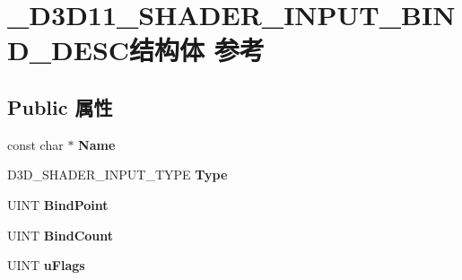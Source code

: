 \hypertarget{struct___d3_d11___s_h_a_d_e_r___i_n_p_u_t___b_i_n_d___d_e_s_c}{}\section{\+\_\+\+D3\+D11\+\_\+\+S\+H\+A\+D\+E\+R\+\_\+\+I\+N\+P\+U\+T\+\_\+\+B\+I\+N\+D\+\_\+\+D\+E\+S\+C结构体 参考}
\label{struct___d3_d11___s_h_a_d_e_r___i_n_p_u_t___b_i_n_d___d_e_s_c}
\subsection*{Public 属性}
\begin{DoxyCompactItemize}
\item 
\mbox{\label{struct___d3_d11___s_h_a_d_e_r___i_n_p_u_t___b_i_n_d___d_e_s_c_a8069ae7f4ca7b982d8411f1a6d663ce6}} 
const char $\ast$ {\bfseries Name}
\item 
\mbox{\label{struct___d3_d11___s_h_a_d_e_r___i_n_p_u_t___b_i_n_d___d_e_s_c_a36a3de62d50d1d5d098d5e629e25feb8}} 
D3\+D\+\_\+\+S\+H\+A\+D\+E\+R\+\_\+\+I\+N\+P\+U\+T\+\_\+\+T\+Y\+PE {\bfseries Type}
\item 
\mbox{\label{struct___d3_d11___s_h_a_d_e_r___i_n_p_u_t___b_i_n_d___d_e_s_c_a799dc93df86352669d49c178b1e3a4f4}} 
U\+I\+NT {\bfseries Bind\+Point}
\item 
\mbox{\label{struct___d3_d11___s_h_a_d_e_r___i_n_p_u_t___b_i_n_d___d_e_s_c_a6c517c8521e60287e8792e899078501c}} 
U\+I\+NT {\bfseries Bind\+Count}
\item 
\mbox{\label{struct___d3_d11___s_h_a_d_e_r___i_n_p_u_t___b_i_n_d___d_e_s_c_ae13cb43ffe11c3e1bf520df883f687a9}} 
U\+I\+NT {\bfseries u\+Flags}
\item 
\mbox{\label{struct___d3_d11___s_h_a_d_e_r___i_n_p_u_t___b_i_n_d___d_e_s_c_a4872ca46472bdd542c257bc267104099}} 

\end{DoxyCompactItemize}
